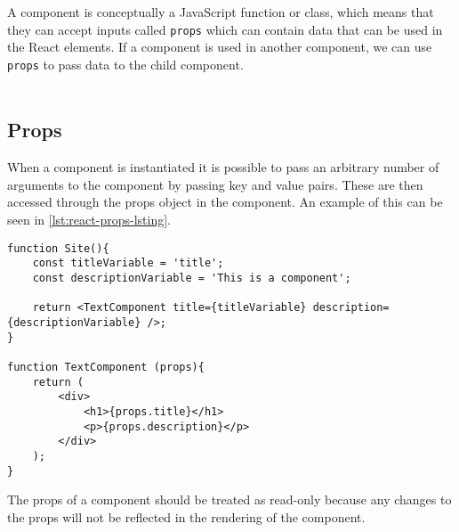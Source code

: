 A component is conceptually a JavaScript function or class, which means that they can accept inputs called \texttt{props} which can contain data that can be used in the React elements.
If a component is used in another component, we can use \texttt{props} to pass data to the child component.
\\\\
\subsection*{Props}
When a component is instantiated it is possible to pass an arbitrary number of arguments to the component by passing key and value pairs.
These are then accessed through the props object in the component.
An example of this can be seen in \autoref{lst:react-props-lsting}.

\begin{lstlisting}[caption={An example of how properties are passed to children components}, label={lst:react-props-lsting}]
function Site(){
	const titleVariable = 'title';
	const descriptionVariable = 'This is a component';

	return <TextComponent title={titleVariable} description={descriptionVariable} />;
}

function TextComponent (props){
	return (
		<div>
			<h1>{props.title}</h1>
			<p>{props.description}</p>
		</div>
	);
}
\end{lstlisting}

The props of a component should be treated as read-only because any changes to the props will not be reflected in the rendering of the component.

